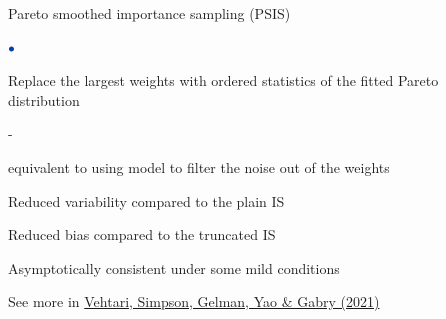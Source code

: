 \documentclass[english,t]{beamer}
\newenvironment{list1}{
   \begin{list}{$\color{list1}\bullet$}{\itemsep=6pt}}{
  \end{list}}
\newenvironment{list2}{
  \begin{list}{-}{\baselineskip=12pt\itemsep=2pt}}{
  \end{list}}
\begin{document}


\begin{frame}{Pareto smoothed importance sampling (PSIS)}

  \vspace{-.5\baselineskip}
  
  \begin{list1}
    \item Replace the largest weights with ordered statistics of the
      fitted Pareto distribution
      \begin{list2}
      \item equivalent to using model to filter the noise out of the weights
      \end{list2}
      \item<2-> Reduced variability compared to the plain IS
      \item<2-> Reduced bias compared to the truncated IS
      \item<3-> Asymptotically consistent under some mild conditions
      \end{list1}
      \vspace{7\baselineskip}

      
      See more in \href{https://arxiv.org/abs/1507.02646}{Vehtari, Simpson, Gelman, Yao \& Gabry (2021)}
\end{frame}
\end{document}
